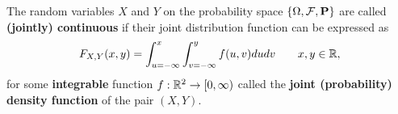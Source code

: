 \begin{definition}
The random variables $X$ and $Y$ on the probability space $\{ \Omega, \mathcal{F}, \mathbf{P} \}$ are called \textbf{(jointly) continuous} if their joint distribution function can be expressed as 
\begin{equation*}
    F_{X,Y}(x,y) = \int_{u = -\infty}^x \int_{v = -\infty}^y f(u,v)du dv \qquad x, y\in\mathbb{R},
\end{equation*}
for some \textbf{integrable} function $f : \mathbb{R}^2 \to [0, \infty)$ called the \textbf{joint (probability) density function} of the pair $(X, Y)$. 
\end{definition}

